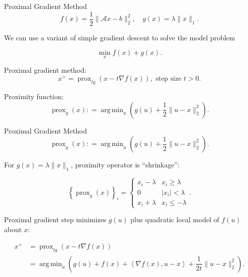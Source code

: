 \documentclass[xcolor=dvipsnames,t]{beamer} %
\newcommand{\defeq}{\mathrel{\mathop:}=}
\DeclareMathOperator*{\argmin}{arg\,min}
\begin{document}

\begin{frame}{Proximal Gradient Method}
   \[ f(x) = \dfrac{1}{2}\|\mathcal{A}x-b\|_2^2, \quad g(x) = \lambda \|x\|_1. \] 

   We can use a variant of simple gradient descent to solve the model problem

   \[ \min_x f(x) + g(x). \] 

   Proximal gradient method:
   \[ x^{+} = \operatorname{prox}_{t g}\left(x - t\nabla f(x)\right), \text{ step size $t>0$}. \] 
   
   Proximity function: 
   \[ \operatorname{prox}_g(x) \defeq \argmin_u\left(g(u) + \dfrac{1}{2}\|u-x\|_2^2\right). \] 

\end{frame}

\begin{frame}{Proximal Gradient Method}
   \[ \operatorname{prox}_g(x) \defeq \argmin_u\left(g(u) + \dfrac{1}{2}\|u-x\|_2^2\right). \] 

   For $g(x) = \lambda\|x\|_1$, proximity operator is ``shrinkage'':

   \[ \left\{\operatorname{prox}_g(x)\right\}_i = \left\{\begin{array}{ll} x_i-\lambda & x_i \ge \lambda\\0 & |x_i| < \lambda\\ x_i + \lambda & x_i\le -\lambda\end{array}\right.. \] 

   Proximal gradient step minimizes $g(u)$ plus quadratic local model of $f(u)$ about $x$:

   \begin{align*}
      x^+ &= \operatorname{prox}_{t g}\left(x - t\nabla f(x)\right)\\
              &= \argmin_u\left(g(u) + f(x) + \left\langle \nabla f(x), u-x\right\rangle + \dfrac{1}{2t}\|u-x\|_2^2\right).
   \end{align*}

\end{frame}
\end{document}
